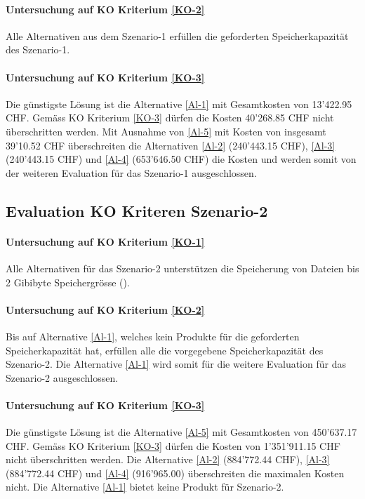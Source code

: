 \paragraph*{Untersuchung auf KO Kriterium \ref{KO-2}}
Alle Alternativen aus dem Szenario-1 erfüllen die geforderten Speicherkapazität des Szenario-1.

\paragraph*{Untersuchung auf KO Kriterium \ref{KO-3}}
Die günstigste Lösung ist die Alternative \ref{Al-1} mit Gesamtkosten von 13'422.95 CHF. Gemäss KO Kriterium \ref{KO-3} dürfen die Kosten 40'268.85 CHF nicht überschritten werden. Mit Ausnahme von \ref{Al-5} mit Kosten von insgesamt 39'10.52 CHF überschreiten die Alternativen \ref{Al-2} (240’443.15 CHF), \ref{Al-3} (240’443.15 CHF) und \ref{Al-4} (653’646.50 CHF) die Kosten und werden somit von der weiteren Evaluation für das Szenario-1 ausgeschlossen.

\subsection{Evaluation KO Kriteren Szenario-2}

\paragraph*{Untersuchung auf KO Kriterium \ref{KO-1}}
Alle Alternativen für das Szenario-2 unterstützen die Speicherung von Dateien bis 2 Gibibyte Speichergrösse ().

\paragraph*{Untersuchung auf KO Kriterium \ref{KO-2}}
Bis auf Alternative \ref{Al-1}, welches kein Produkte für die geforderten Speicherkapazität hat, erfüllen alle die vorgegebene Speicherkapazität des Szenario-2. Die Alternative \ref{Al-1} wird somit für die weitere Evaluation für das Szenario-2 ausgeschlossen.

\paragraph*{Untersuchung auf KO Kriterium \ref{KO-3}}
Die günstigste Lösung ist die Alternative  \ref{Al-5} mit Gesamtkosten von 450'637.17 CHF. Gemäss KO Kriterium \ref{KO-3} dürfen die Kosten von 1'351'911.15 CHF nicht überschritten werden. Die Alternative \ref{Al-2} (884’772.44 CHF), \ref{Al-3} (884’772.44 CHF) und \ref{Al-4} (916’965.00) überschreiten die maximalen Kosten nicht. Die Alternative \ref{Al-1} bietet keine Produkt für Szenario-2.

